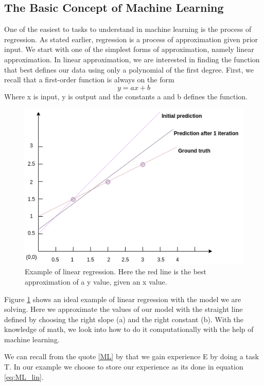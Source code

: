     
\subsection{The Basic Concept of Machine Learning}   
\label{cha:concept}
One of the easiest to tasks to understand in machine learning is the process of regression. As stated earlier, regression is a process of approximation given prior input.
We start with one of the simplest forms of approximation, namely linear approximation. In linear approximation, we are interested in finding the function that best defines our data using only a polynomial of the first degree.  First, we recall that a first-order function is always on the form
\begin{equation}
y = ax +b 
\end{equation}
Where x is input, y is output and the constants a and b defines the function.
    
\begin{figure}
\centering
\includegraphics[scale=0.7]{background/figures/regression.png}
\caption{Example of linear regression. Here the red line is the best approximation of a y value, given an x value.} 
\label{fig:regression_example}
\end{figure} 
Figure \ref{fig:regression_example} shows an ideal example of linear regression with the model we are solving. Here we approximate the values of our model with the straight line defined by choosing the right slope (a) and the right constant (b).
With the knowledge of math, we look into how to do it computationally with the help of machine learning. 


We can recall from the quote \ref{ML} by \cite{MitchellTomM1997Ml} that we gain experience E by doing a task T. In our example we choose to store our experience as its done in equation \ref{eq:ML_lin}.
    
